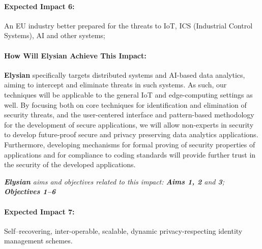\documentclass[a4paper,11pt]{article}
\newcommand{\project}[1]{\textbf{#1}\xspace}
\newcommand{\SECURITY}{\project{Elysian}}
\newcommand{\TheProject}{\SECURITY}
\begin{document}
\begin{mdframed}[backgroundcolor=blue!5]
\paragraph{Expected Impact 6:}
An EU industry better prepared for the threats to IoT, ICS (Industrial Control Systems), AI and other systems;
\end{mdframed}

\begin{mdframed}[backgroundcolor=gray!10]
\paragraph{How Will \TheProject{} Achieve This Impact:}
\TheProject{} specifically targets distributed systems and AI-based data analytics, aiming to intercept and eliminate threats in such systems. As such, our techniques will be applicable to the general IoT and edge-computing settings as well. By focusing both on core techniques for identification and elimination of security threats, and the user-centered interface and pattern-based methodology for the development of secure applications, we will allow non-experts in security to develop future-proof secure and privacy preserving data analytics applications. Furthermore, developing mechanisms for formal proving of security properties of applications and for compliance to coding standards will provide further trust in the security of the developed applications.

\emph{\TheProject{} aims and objectives related to this impact: \textbf{Aims 1, 2}  and \textbf{3}; \textbf{Objectives 1--6} }

\end{mdframed}

\begin{mdframed}[backgroundcolor=blue!5]
\paragraph{Expected Impact 7:}
Self–recovering, inter-operable, scalable, dynamic privacy-respecting identity management schemes.
\end{mdframed}
\end{document}
